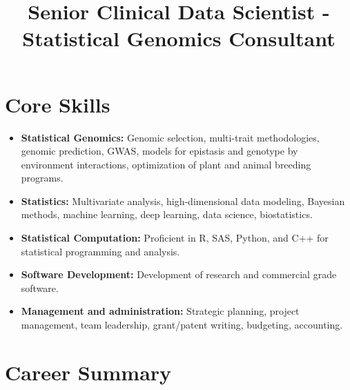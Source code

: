 \documentclass[11pt,a4paper,]{moderncv}
\title{Senior Clinical Data Scientist - Statistical Genomics Consultant}
\providecommand{\tightlist}{%
	\setlength{\itemsep}{0pt}\setlength{\parskip}{0pt}}
\begin{document}
\makecvtitle



\section{Core Skills}\label{core-skills}

\begin{itemize}
\tightlist
\item
  \textbf{Statistical Genomics:} Genomic selection, multi-trait
  methodologies, genomic prediction, GWAS, models for epistasis and
  genotype by environment interactions, optimization of plant and animal
  breeding programs.
\item
  \textbf{Statistics:} Multivariate analysis, high-dimensional data
  modeling, Bayesian methods, machine learning, deep learning, data
  science, biostatistics.
\item
  \textbf{Statistical Computation:} Proficient in R, SAS, Python, and
  C++ for statistical programming and analysis.
\item
  \textbf{Software Development:} Development of research and commercial
  grade software.
\item
  \textbf{Management and administration:} Strategic planning, project
  management, team leadership, grant/patent writing, budgeting,
  accounting.
\end{itemize}

\section{Career Summary}\label{career-summary}
\end{document}
